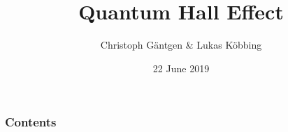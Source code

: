 \documentclass[UKenglish, xcolor=dvipsnames]{beamer}
\begin{document}
\title{Quantum Hall Effect}
\date{22 June 2019}
\author{Christoph Gäntgen \& Lukas Köbbing}
\maketitle



\begin{frame}
	\frametitle{Contents}
	\tableofcontents
\end{frame}










\end{document}
